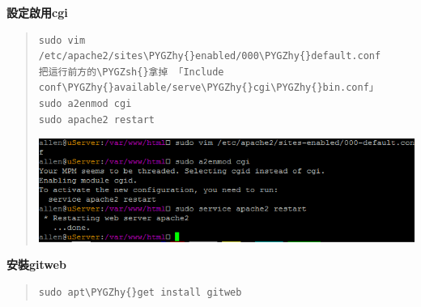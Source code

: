 \documentclass[letterpaper,10pt,english]{sphinxmanual}
\def\PYGZsh{\char`\#}
\def\PYGZhy{\char`\-}
\begin{document}
\textbf{設定啟用cgi}
\begin{quote}

\begin{Verbatim}[commandchars=\\\{\}]
sudo vim /etc/apache2/sites\PYGZhy{}enabled/000\PYGZhy{}default.conf
把這行前方的\PYGZsh{}拿掉 「Include conf\PYGZhy{}available/serve\PYGZhy{}cgi\PYGZhy{}bin.conf」
sudo a2enmod cgi
sudo apache2 restart
\end{Verbatim}

\includegraphics{gitolite3-cgi-1.png}
\end{quote}

\textbf{安裝gitweb}
\begin{quote}

\begin{Verbatim}[commandchars=\\\{\}]
sudo apt\PYGZhy{}get install gitweb
\end{Verbatim}
\end{quote}
\end{document}
